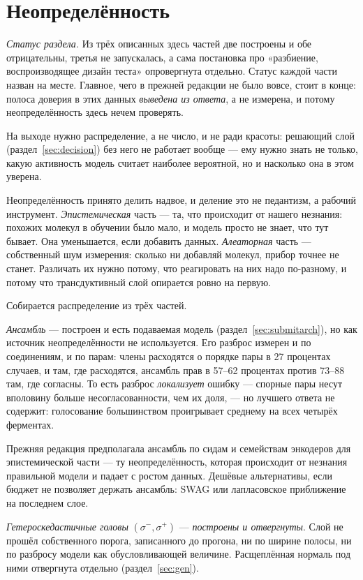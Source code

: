 \section{Неопределённость}
\label{sec:unc}

\emph{Статус раздела.} Из трёх описанных здесь частей две построены и обе отрицательны, третья не
запускалась, а сама постановка про «разбиение, воспроизводящее дизайн теста» опровергнута отдельно.
Статус каждой части назван на месте. Главное, чего в прежней редакции не было вовсе, стоит в конце:
полоса доверия в этих данных \emph{выведена из ответа}, а не измерена, и потому неопределённость
здесь нечем проверять.

На выходе нужно распределение, а не число, и не ради красоты: решающий слой
(раздел~\ref{sec:decision}) без него не работает вообще --- ему нужно знать не только, какую
активность модель считает наиболее вероятной, но и насколько она в этом уверена.

Неопределённость принято делить надвое, и деление это не педантизм, а рабочий инструмент.
\emph{Эпистемическая} часть --- та, что происходит от нашего незнания: похожих молекул в
обучении было мало, и модель просто не знает, что тут бывает. Она уменьшается, если добавить
данных. \emph{Алеаторная} часть --- собственный шум измерения: сколько ни добавляй молекул,
прибор точнее не станет. Различать их нужно потому, что реагировать на них надо
по-разному, и потому что трансдуктивный слой опирается ровно на первую.

Собирается распределение из трёх частей.

\emph{Ансамбль} --- построен и есть подаваемая модель (раздел~\ref{sec:submitarch}), но как источник
неопределённости не используется. Его разброс измерен и по соединениям, и по парам: члены расходятся
о порядке пары в 27 процентах случаев, и там, где расходятся, ансамбль прав в 57--62 процентах против
73--88 там, где согласны. То есть разброс \emph{локализует} ошибку --- спорные пары несут вполовину
больше несогласованности, чем их доля, --- но лучшего ответа не содержит: голосование большинством
проигрывает среднему на всех четырёх ферментах.

Прежняя редакция предполагала ансамбль по сидам и семействам энкодеров для эпистемической части --- ту неопределённость, которая
происходит от незнания правильной модели и падает с ростом данных. Дешёвые альтернативы, если бюджет
не позволяет держать ансамбль: SWAG или лапласовское приближение на последнем слое.

\emph{Гетероскедастичные головы} $(\sigma^-,\sigma^+)$ --- \emph{построены и отвергнуты}. Слой не
прошёл собственного порога, записанного до прогона, ни по ширине полосы, ни по разбросу модели как
обусловливающей величине. Расщеплённая нормаль под ними отвергнута отдельно (раздел~\ref{sec:gen}).

